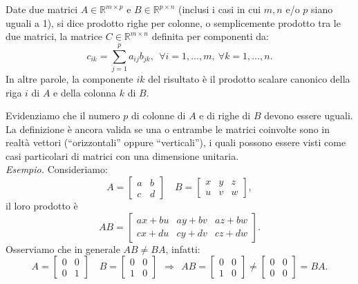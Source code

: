 \begin{definition}
Date due matrici $A\in \mathbb{R}^{m\times p}$ e $B\in \mathbb{R}^{p\times n}$ (inclusi i casi in cui $m, n$ e/o $p$ siano uguali a 1), si dice prodotto righe per colonne, o semplicemente prodotto tra le due matrici, la matrice $C\in \mathbb{R}^{m\times n}$ definita per componenti da:
\begin{equation*}
c_{ik} =\sum _{j=1}^{p} a_{ij} b_{jk} ,\ \ \forall i=1,\dotsc ,m,\ \forall k=1,\dotsc ,n.
\end{equation*}
In altre parole, la componente $ik$ del risultato è il prodotto scalare canonico della riga $i$ di $A$ e della colonna $k$ di $B$.
\end{definition}
Evidenziamo che il numero $p$ di colonne di $A$ e di righe di $B$ devono essere uguali. \\
La definizione è ancora valida se una o entrambe le matrici coinvolte sono in realtà vettori (``orizzontali'' oppure ``verticali''), i quali possono essere visti come casi particolari di matrici con una dimensione unitaria. \\
\textit{Esempio.} Consideriamo:
\begin{equation*}
A=\begin{bmatrix}
a & b\\
c & d
\end{bmatrix} \quad B=\begin{bmatrix}
x & y & z\\
u & v & w
\end{bmatrix} ,
\end{equation*}
il loro prodotto è
\begin{equation*}
AB=\begin{bmatrix}
ax+bu & ay+bv & az+bw\\
cx+du & cy+dv & cz+dw
\end{bmatrix} .
\end{equation*}
Osserviamo che in generale $AB\neq BA$, infatti:
\begin{equation*}
A=\begin{bmatrix}
0 & 0\\
0 & 1
\end{bmatrix} \quad B=\begin{bmatrix}
0 & 0\\
1 & 0
\end{bmatrix} \ \ \Rightarrow \ \ AB=\begin{bmatrix}
0 & 0\\
1 & 0
\end{bmatrix} \neq \begin{bmatrix}
0 & 0\\
0 & 0
\end{bmatrix} =BA.
\end{equation*}
